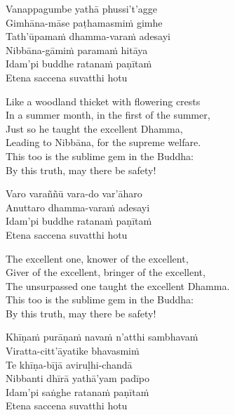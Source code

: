 \begin{pali-hang-continued}
  Vanappagumbe yathā phussi't'agge\\
  Gimhāna-māse paṭhamasmiṁ gimhe\\
  Tath'ūpamaṁ dhamma-varaṁ adesayi\\
  Nibbāna-gāmiṁ paramaṁ hitāya\\
  Idam'pi buddhe ratanaṁ paṇītaṁ\\
  Etena saccena suvatthi hotu
\end{pali-hang-continued}

\begin{english-verses}
  Like a woodland thicket with flowering crests\\
  In a summer month, in the first of the summer,\\
  Just so he taught the excellent Dhamma,\\
  Leading to Nibbāna, for the supreme welfare.\\
  This too is the sublime gem in the Buddha:\\
  By this truth, may there be safety!
\end{english-verses}

\begin{pali-hang-continued}
  Varo varaññū vara-do var'āharo\\
  Anuttaro dhamma-varaṁ adesayi\\
  Idam'pi buddhe ratanaṁ paṇītaṁ\\
  Etena saccena suvatthi hotu
\end{pali-hang-continued}

\begin{english-verses}
  The excellent one, knower of the excellent,\\
  Giver of the excellent, bringer of the excellent,\\
  The unsurpassed one taught the excellent Dhamma.\\
  This too is the sublime gem in the Buddha:\\
  By this truth, may there be safety!
\end{english-verses}

\begin{pali-hang-continued}
  Khīṇaṁ purāṇaṁ navaṁ n'atthi sambhavaṁ\\
  Viratta-citt'āyatike bhavasmiṁ\\
  Te khīṇa-bījā aviruḷhi-chandā\\
  Nibbanti dhīrā yathā'yam padīpo\\
  Idam'pi saṅghe ratanaṁ paṇītaṁ\\
  Etena saccena suvatthi hotu
\end{pali-hang-continued}

